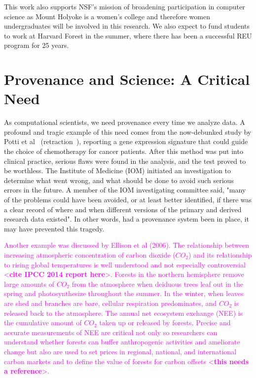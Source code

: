 \documentclass[10pt]{article}
\begin{document}
This work also supports NSF's mission of broadening participation
in computer science as Mount Holyoke is a women's college and
therefore women undergraduates will be involved in this research.
We also expect to fund students to work at Harvard Forest in the
summer, where there has been a successful REU program for 25 years.



\section{Provenance and Science: A Critical Need}
\label{sec:need}

As computational scientists, we need provenance
every time we analyze data. 
A profound and tragic example of this need comes from the now-debunked study by
Potti et al~\cite{pmid17057710} (retraction~\cite{pmid21217686}),
reporting a
gene expression signature that could guide the choice of chemotherapy
for cancer patients.  After this method was put into clinical
practice, serious flaws were found in the analysis, and the test
proved to be worthless. The Institute of Medicine (IOM) initiated
an investigation to determine what went wrong, and what should be
done to avoid such serious errors in the future.
A member of the IOM investigating committee said,
"many of the problems could have
been avoided, or at least better identified, if there was a clear
record of where and when different versions of the primary and
derived research data existed".  In other words, had a provenance
system been in place, it may have prevented this tragedy.

\textcolor{magenta}{Another example was discussed by Ellison et al
(2006).  The relationship between increasing atmospheric concentration of
carbon dioxide ($CO_{2}$) and its relationship to rising global
temperatures is well understood and not especially controversial
<\textbf{cite IPCC 2014 report here}>. Forests in the northern
hemisphere remove large amounts of $CO_{2}$ from the atmosphere when
deiduous trees leaf out in the spring and photosynthesize throughout
the summer. In the winter, when leaves are shed and branches are bare,
cellular respiration predominates, and $CO_{2}$ is released back to the
atmosphere. The annual net ecosystem exchange (NEE) is the cumulative
amount of $CO_{2}$ taken up or released by forests. Precise and accurate
measurements of NEE are critical not only so researchers can
understand whether forests can buffer anthropogenic activities and
ameliorate  change but also are used to set prices in regional,
national, and international carbon markets and to define the value of
forests for carbon offsets <\textbf{this needs a reference}>.
}
\end{document}
